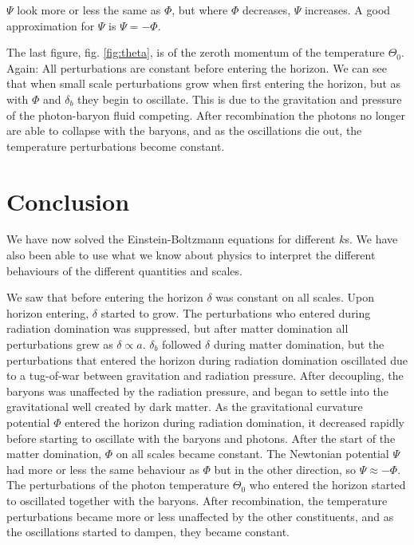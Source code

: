 \documentclass[a4paper,norsk, 10pt]{article}
\begin{document}
$\Psi$ look more or less the same as $\Phi$, but where $\Phi$ decreases, $\Psi$ increases. A good approximation for $\Psi$ is $\Psi = - \Phi$.

The last figure, fig. \ref{fig:theta}, is of the zeroth momentum of the temperature $\Theta_0$. Again: All perturbations are constant before entering the horizon. We can see that when small scale perturbations grow when first entering the horizon, but as with $\Phi$ and $\delta_b$ they begin to oscillate. This is due to the gravitation and pressure of the photon-baryon fluid competing. After recombination the photons no longer are able to collapse with the baryons, and as the oscillations die out, the temperature perturbations become constant.





\section{Conclusion}
We have now solved the Einstein-Boltzmann equations for different $k$s. We have also been able to use what we know about physics to interpret the different behaviours of the different quantities and scales. 

We saw that before entering the horizon $\delta$ was constant on all scales. Upon horizon entering, $\delta$ started to grow. The perturbations who entered during radiation domination was suppressed, but after matter domination all perturbations grew as $\delta \propto a$. $\delta_b$ followed $\delta$ during matter domination, but the perturbations that entered the horizon during radiation domination oscillated due to a tug-of-war between gravitation and radiation pressure. After decoupling, the baryons was unaffected by the radiation pressure, and began to settle into the gravitational well created by dark matter.
As the gravitational curvature potential $\Phi$ entered the horizon during radiation domination, it decreased rapidly before starting to oscillate with the baryons and photons. After the start of the matter domination, $\Phi$ on all scales became constant. The Newtonian potential $\Psi$ had more or less the same behaviour as $\Phi$ but in the other direction, so $\Psi \approx -\Phi$.
The perturbations of the photon temperature $\Theta_0$ who entered the horizon started to oscillated together with the baryons. After recombination, the temperature perturbations became more or less unaffected by the other constituents, and as the oscillations started to dampen, they became constant.
\end{document}
